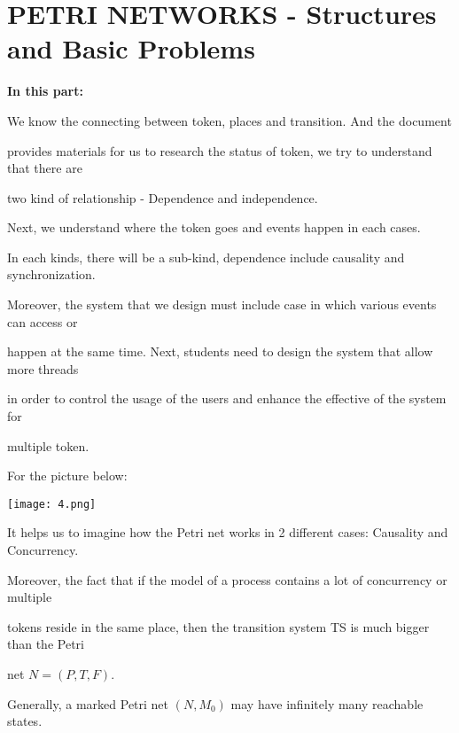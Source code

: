 \documentclass[a4paper]{article}
\begin{document}
\section{PETRI NETWORKS - Structures and Basic Problems}
\textbf{In this part:}
\par\null\par
We know the connecting between token, places and transition. And the document\par
provides materials for us to research the status of token, we try to understand that there are\par
two kind of relationship - Dependence and independence.
\par\null\par
Next, we understand where the token goes and events happen in each cases.\par
In each kinds, there will be a sub-kind, dependence include causality and synchronization.\par
\par\null\par
Moreover, the system that we design must include case in which various events can access or\par
happen at the same time. Next, students need to design the system that allow more threads\par
in order to control the usage of the users and enhance the effective of the system for\par
multiple token.
\par\null\par
For the picture below:
\begin{center}
    \texttt{[image: 4.png]}
\end{center}
\par
It helps us to imagine how the Petri net works in 2 different cases: Causality and Concurrency.
\par\null\par
Moreover, the fact that if the model of a process contains a lot of concurrency or multiple\par
tokens reside in the same place, then the transition system TS is much bigger than the Petri\par
net $N = (P, T, F)$.
\par\null\par
Generally, a marked Petri net $(N, M_{0})$ may have infinitely many reachable states.

\vspace{1 cm}
\end{document}
